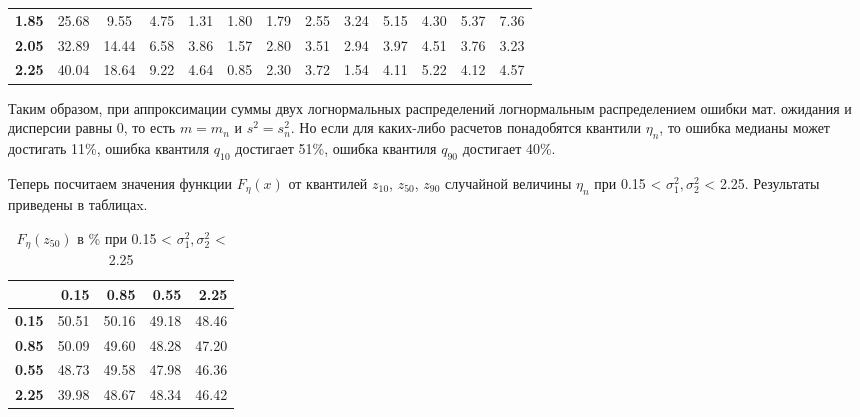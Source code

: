 \documentclass[12pt]{article}
\begin{document}
\begin{table}[]
\begin{tabular}{|c|ccclcccccccc}
		\textbf{1.85}                       & 25.68                              & 9.55                               & 4.75                               & 1.31                               & 1.80                               & 1.79                               & 2.55                               & 3.24                               & 5.15                               & 4.30                               & 5.37                               & 7.36                               \\ \cline{1-1}
		\textbf{2.05}                       & 32.89                              & 14.44                              & 6.58                               & 3.86                               & 1.57                               & 2.80                               & 3.51                               & 2.94                               & 3.97                               & 4.51                               & 3.76                               & 3.23                               \\ \cline{1-1}
		\multicolumn{1}{|l|}{\textbf{2.25}} & \multicolumn{1}{l}{40.04}          & \multicolumn{1}{l}{18.64}          & \multicolumn{1}{l}{9.22}           & 4.64                               & \multicolumn{1}{l}{0.85}           & \multicolumn{1}{l}{2.30}           & \multicolumn{1}{l}{3.72}           & \multicolumn{1}{l}{1.54}           & \multicolumn{1}{l}{4.11}           & \multicolumn{1}{l}{5.22}           & \multicolumn{1}{l}{4.12}           & \multicolumn{1}{l}{4.57}           \\ \cline{1-1}
	\end{tabular}
\end{table}

Таким образом, при аппроксимации суммы двух логнормальных распределений логнормальным распределением ошибки мат. ожидания и дисперсии равны 0, то есть $m=m_{n}$ и $s^{2} = s_{n}^{2}$. Но если для каких-либо расчетов понадобятся квантили $\eta_{n}$, то ошибка медианы может достигать 11\%, ошибка  квантиля $q_{10}$ достигает 51\%, ошибка квантиля $q_{90}$ достигает 40\%.

Теперь посчитаем значения функции $F_{\eta}(x)$ от квантилей $z_{10}$, $z_{50}$, $z_{90}$ случайной величины $\eta_{n}$ при 0.15 < $\sigma_{1}^{2}, \sigma_{2}^{2}$ < 2.25. Результаты приведены в таблицаx.

\begin{table}[]
	\centering
	\caption{$F_{\eta}(z_{50})$ в \% при 0.15 < $\sigma_{1}^{2}, \sigma_{2}^{2}$ < 2.25 }
	\begin{tabular}{rrrrr}
		\hline
		& \textbf{0.15} & \textbf{0.85} & \textbf{0.55} & \textbf{2.25} \\ 
		\hline
		\textbf{0.15} & 50.51 & 50.16 & 49.18 & 48.46 \\ 
		\textbf{0.85} & 50.09 & 49.60 & 48.28 & 47.20 \\ 
		\textbf{0.55} & 48.73 & 49.58 & 47.98 & 46.36 \\ 
		\textbf{2.25} & 39.98 & 48.67 & 48.34 & 46.42 \\ 
		\hline
	\end{tabular}
\end{table}
\end{document}
